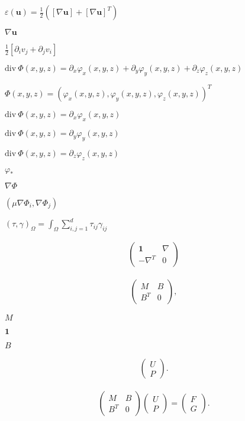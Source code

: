 \documentclass{article}
\begin{document}
$\varepsilon(\mathbf u) = \frac 12 \left([\nabla\mathbf u] + [\nabla\mathbf u]^T\right)$
\pagebreak

$\nabla\mathbf u$
\pagebreak

$\frac 12[\partial_i v_j + \partial_j v_i]$
\pagebreak

$\mathrm{div}\ \Phi(x,y,z)=\partial_x\varphi_x(x,y,z) + \partial_y\varphi_y(x,y,z) + \partial_z\varphi_z(x,y,z)$
\pagebreak

$\Phi(x,y,z)=(\varphi_x(x,y,z), \varphi_y(x,y,z), \varphi_z(x,y,z))^T$
\pagebreak

$\mathrm{div}\ \Phi(x,y,z)=\partial_x\varphi_x(x,y,z)$
\pagebreak

$\mathrm{div}\ \Phi(x,y,z)=\partial_y\varphi_y(x,y,z)$
\pagebreak

$\mathrm{div}\ \Phi(x,y,z)=\partial_z\varphi_z(x,y,z)$
\pagebreak

$\varphi_\ast$
\pagebreak

$\nabla\Phi$
\pagebreak

$(\mu \nabla\Phi_i,\nabla\Phi_j)$
\pagebreak

$(\tau, \gamma)_\Omega=\int_\Omega \sum_{i,j=1}^d \tau_{ij} \gamma_{ij}$
\pagebreak

\begin{eqnarray*} \left( \begin{array}{cc} \mathbf 1 & \nabla \\ -\nabla^T & 0 \end{array} \right) \end{eqnarray*}
\pagebreak

\begin{eqnarray*} \left( \begin{array}{cc} M & B \\ B^T & 0 \end{array} \right), \end{eqnarray*}
\pagebreak

$M$
\pagebreak

$\mathbf 1$
\pagebreak

$B$
\pagebreak

\begin{eqnarray*} \left( \begin{array}{c} U \\ P \end{array} \right). \end{eqnarray*}
\pagebreak

\begin{eqnarray*} \left( \begin{array}{cc} M & B \\ B^T & 0 \end{array} \right) \left( \begin{array}{c} U \\ P \end{array} \right) = \left( \begin{array}{c} F \\ G \end{array} \right). \end{eqnarray*}
\pagebreak
\end{document}
